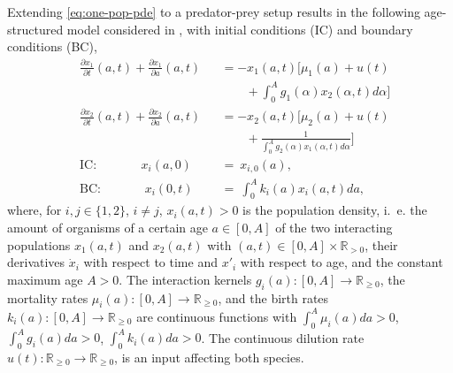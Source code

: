 \documentclass[journal,twoside,web]{ieeecolor}
\begin{document}
Extending \eqref{eq:one-pop-pde} to a predator-prey setup results in the following age-structured model considered in \cite{veil2025stabilization}, with initial conditions (IC) and boundary conditions (BC),
\begin{subequations}
	\begin{alignat}{3}
	&\frac{\partial x_1}{\partial t}(a,t) + \frac{\partial x_1}{\partial a}(a,t) &&=  
	- x_1(a,t)  \Bigg[ \mu_1(a) + u(t)  
  \nonumber \\ & && \qquad  + \int_0^A g_1(\alpha) x_2(\alpha,t) d \alpha 
    \Bigg]  \label{eq:ipde1}\\ 
 	&\frac{\partial x_2}{\partial t}(a,t) + \frac{\partial x_2}{\partial a}(a,t) &&= 
	- x_2(a,t)  \Bigg[ \mu_2(a) + u(t) 
      \nonumber \\ & && \qquad + \frac{1}{\int_0^A g_2(\alpha) x_1(\alpha,t) d \alpha} 
    \Bigg] 
     \label{eq:ipde2}\\ 
	&\text{IC}: \qquad\quad \ \ x_i(a, 0) &&=\  x_{i,0}(a), \label{eq:ic} \\
	&\text{BC}: \qquad\quad \, \ x_i(0,t) &&=\ \int_0^A k_i(a) x_i(a,t) d a  \label{eq:bc},
 \end{alignat} \label{eq:pred-prey-model}%
\end{subequations}
where, for $i,j \in \{1,2\}$, $i\neq j$, $x_i(a,t)>0$ is the population density, i.~e. the amount of organisms of a certain age $a \in [0,A]$ of the two interacting populations $x_1(a,t)$ and $x_2(a,t)$ with $(a,t) \in [0,A] \times \mathbb{R}_{> 0}$, their derivatives $\dot{x}_i$ with respect to time and $x'_i$ with respect to age, and the constant maximum age $A>0$. 
The interaction kernels $g_i(a):[0,A]\rightarrow\mathbb{R}_{\geq 0}$, the mortality rates $\mu_i(a):[0,A]\rightarrow\mathbb{R}_{\geq 0}$, and the birth rates $k_i(a):[0,A]\rightarrow\mathbb{R}_{\geq 0}$ are continuous functions with $\int_0^A \mu_i(a)d a > 0$, $\int_0^A g_i(a)d a > 0$, $\int_0^A k_i(a)d a >0$. The continuous dilution rate $u(t):\mathbb{R}_{\geq 0}\rightarrow \mathbb{R}_{\geq 0}$, is an input affecting both species.
\end{document}
